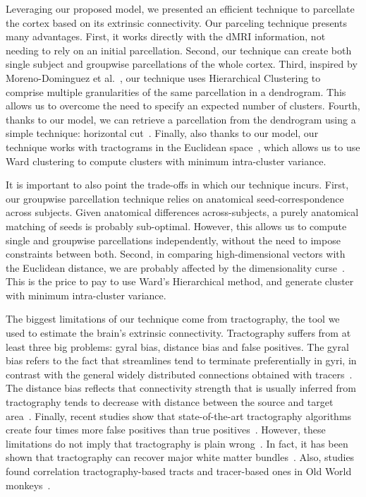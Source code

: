 Leveraging our proposed model, we presented an efficient technique to parcellate
the cortex based on its extrinsic connectivity. Our parceling technique presents
many advantages. First, it works directly with the dMRI information, not needing
to rely on an initial parcellation. Second, our technique can create both
single subject and groupwise parcellations of the whole cortex. Third, inspired
by Moreno-Dominguez et al.~\cite{Moreno-Dominguez2014}, our technique uses Hierarchical
Clustering to comprise multiple granularities of the same parcellation in a
dendrogram. This allows us to overcome the need to specify an expected number
of clusters. Fourth, thanks to our model, we can retrieve a parcellation from
the dendrogram using a simple technique: horizontal cut~\cite{Murtagh2011}.
Finally, also thanks to our model, our technique works with tractograms
in the Euclidean space~\cite{Pohl2007}, which allows us to use Ward clustering
to compute clusters with minimum intra-cluster variance.

It is important to also point the trade-offs in which our technique incurs. First,
our groupwise parcellation technique relies on anatomical seed-correspondence across
subjects. Given anatomical differences across-subjects, a purely anatomical
matching of seeds is probably sub-optimal. However, this allows us to compute
single and groupwise parcellations independently, without the need to impose
constraints between both. Second, in comparing high-dimensional vectors with the
Euclidean distance, we are probably affected by the dimensionality curse~\cite{Beyer1999}.
This is the price to pay to use Ward's Hierarchical method, and generate cluster
with minimum intra-cluster variance. 

The biggest limitations of our technique come from tractography, the tool
we used to estimate the brain's extrinsic connectivity. Tractography suffers
from at least three big problems: gyral bias, distance bias and false positives.
The gyral bias refers to the fact that streamlines tend to terminate preferentially
in gyri, in contrast with the general widely distributed connections obtained with
tracers~\cite{VanEssen2014}. The distance bias reflects that connectivity strength
that is usually inferred from tractography tends to decrease with distance
between the source and target area~\cite{Jbabdi2013}. Finally, recent studies
show that state-of-the-art tractography algorithms create four times more false
positives than true positives~\cite{Hein2016}. However, these limitations do not
imply that tractography is plain wrong~\cite{Asimov1988}. In fact, it has been
shown that tractography can recover major white matter bundles~\cite{Catani2008}.
Also, studies found correlation tractography-based tracts and tracer-based
ones in Old World monkeys~\cite{Donahue2016}.


